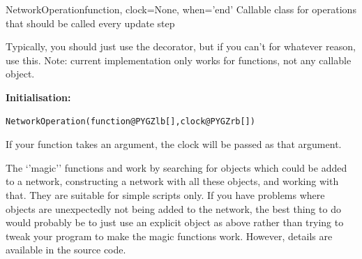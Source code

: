 \documentclass[letterpaper,10pt,english]{manual}
\begin{document}
\hypertarget{brian.NetworkOperation}{}\begin{classdesc}{NetworkOperation}{function, clock=None, when='end'}
Callable class for operations that should be called every update step

Typically, you should just use the \hyperlink{brian.network_operation}{} decorator, but if you
can't for whatever reason, use this. Note: current implementation only works for
functions, not any callable object.

\textbf{Initialisation:}

\begin{Verbatim}[commandchars=@\[\]]
NetworkOperation(function@PYGZlb[],clock@PYGZrb[])
\end{Verbatim}

If your function takes an argument, the clock will be passed
as that argument.
\end{classdesc}

The `'magic'' functions \hyperlink{brian.run}{} and \hyperlink{brian.reinit}{} work by searching for
objects which could be added to a network, constructing a network with all
these objects, and working with that. They are suitable for simple scripts
only. If you have problems where objects are unexpectedly not being added
to the network, the  best thing to do would probably be to just use an
explicit \hyperlink{brian.Network}{} object as above rather than trying to tweak your
program to make the magic functions work. However, details are available
in the  source code.
\end{document}

